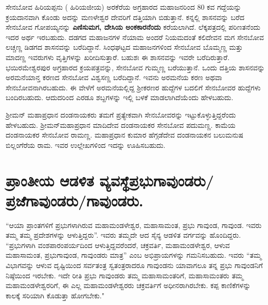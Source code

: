 ಸೇನಬೋವ ಹಿರಿಯಪ್ಪನು ( ಹಿರಿಯಜೀಯ) ಅರಕೆರೆಯ ಅಗ್ರಹಾರದ ಮಹಾಜನರಿಂದ 80 ಕವ ಗದ್ದೆಯನ್ನು ಕ್ರಯದಾನವಾಗಿ ಕೊಂಡು ಅದನ್ನು ಮಣಳೇಶ್ವರ ದೇವರಿಗೆ ದತ್ತಿಯಾಗಿ ಬಿಡುತ್ತಾನೆ. ಕನ್ನಲ್ಲಿ ಶಾಸನವನ್ನು ಬರೆದ ಸೇನಬೋವ ಗೋಪಯ್ಯನನ್ನು \textbf{ಎಣಿಸುಮಗ, ದೇಸಿಯ ಅಂಕಕಾರನೆಂದು} ಕರೆಯಲಾಗಿದೆ. ಲೆಕ್ಕಪತ್ರದಲ್ಲಿ ಪರಿಣತನೆಂದು ಇದರ ಅರ್ಥ ಇರಬಹುದು. ದಡಗದ ಮಹಾಜನಗಳ ನೆಯಾಮ ಅಂದರೆ ನಿಯಮದಂತೆ ಕಲಿದೇವನ ಮಗ ಸೇನಬೋವ ಲಚ್ಚಣ್ಣ ಡಿಡಗದ ಶಾಸನವನ್ನು ಬರೆದಿದ್ದಾನೆ. ಸಿಂಧಘಟ್ಟದ ಮಹಾಜನಗಳಿಂದ ಸೇನಬೋವ ಬೊಮ್ಮಣ್ಣ ಮತ್ತು ಮಾದಣ್ಣ ಇವರುಗಳು ವೃತ್ತಿಗಳನ್ನು ಖರೀದಿಸುತ್ತಾರೆ. ಬಹುಶಃ ಈ ಶಾಸನವನ್ನು ಇವರೇ ಬರೆದಿರುತ್ತಾರೆ. ಭಯಿರಮೇಶ್ವರಪುರ ಅಗ್ರಹಾರದ ಕ್ರಯಪತ್ರವನ್ನು, ಸೇನಬೋವ ಗುಮ್ಮಣ್ಣ ಬರೆಯುತ್ತಾನೆ. ಒಂದು ದತ್ತಿಯ ಶಾಸನವನ್ನು ಅರಮನೆಯಾನ್ತ ಕರಣದ ಸೇನಬೋವ ವಿಶ್ವಸಣ್ಣ ಬರೆದಿದ್ದಾನೆ. ಇವನು ಅರಮನೆಯ ಕರಣ ಅಥವಾ ಸೇನಬೋವನಾಗಿರಬಹುದು. ಈ ವೇಳೆಗೆ ಅರಮನೆಯಲ್ಲಿದ್ದ ಶ‍್ರೀಕರಣರ ಹುದ್ದೆಗಳ ಬದಲಿಗೆ ಸೇನಬೋವರ ಹುದ್ದೆಗಳು ಬಂದಿರಬಹುದು. ಆದುದರಿಂದ ಎರಡೂ ಶಬ್ದಗಳನ್ನು ಇಲ್ಲಿ ಬಳಕೆ ಮಾಡಲಾಗಿದೆಯೆಂದು ಹೇಳಬಹುದು.

ಶ‍್ರೀಮನ್​ ಮಹಾಪ್ರಧಾನ ದಂಡನಾಯಕರು ತಮಗೆ ಪ್ರತ್ಯೇಕವಾಗಿ ಸೇನಬೋವರನ್ನು ಇಟ್ಟುಕೊಳ್ಳುತ್ತಿದ್ದರೆಂದು ಹೇಳ\-ಬಹುದು. ಶ‍್ರೀಮನ್​ಮಹಾಪ್ರಧಾನ ಮಾದಿದೇವ ದಂಡನಾಯಕರ ಸೇನಬೋವ ಪದುಮಣ್ಣ. ಕಾಮೆಯ ದಂಡನಾಯಕರ ಸೇನಬೋವ ರಾಮಣ್ಣ. ಮಹಾಪ್ರಧಾನ ಕುಮಾರ ಹೆಗ್ಗಡೆದೇವ ದಂಡನಾಯಕನ ಬಲುಮನುಷ ಬಿಲ್ಲಂಗೆರೆಯ ರಾಮ. ಇವರ ಉಲ್ಲೇಖಗಳಿಂದ ಇದನ್ನು ಊಹಿಸಬಹುದು.


\section{ಪ್ರಾಂತೀಯ ಆಡಳಿತ ವ್ಯವಸ್ಥೆ\enginline{--}ಪ್ರಭುಗಾವುಂಡರು/ಪ್ರಜೆಗಾವುಂಡರು/ಗಾವುಂಡರು.}

“ಆಯಾ ಪ್ರಾಂತಗಳಿಗೆ ಪ್ರಭುಗಳಾಗಿರುವ ಮಹಾಮಂಡಳೇಶ್ವರ, ಮಹಾಸಾಮಂತ, ಪ್ರಭು ಗಾವುಂಡ, ಗಾವುಂಡ. ಇವರು ತಮ್ಮ ತಮ್ಮ ಪ್ರದೇಶಗಳನ್ನು ಆಳುತ್ತಿದ್ದರು”. ಇವರು ತಮ್ಮದೇ ಆದ ಸೈನ್ಯ ಆಡಳಿತ ವರ್ಗವನ್ನು ಹೊಂದಿದ್ದರು. “ಪ್ರಭುಗಳಾಗಿ ವಂಶಪಾರಂಪರ್ಯದಿಂದ ಆಳುತ್ತಿದ್ದವರೆಂದರೆ, ಚಕ್ರವರ್ತಿ, ಮಹಾಮಂಡಳೇಶ್ವರ, ಆಳುವ ಮಹಾಸಾಮಂತ, ಪ್ರಭುಗಾವುಂಡ, ಗಾವುಂಡರು ಮಾತ್ರ” ಎಂಬ ಅಭಿಪ್ರಾಯಗಳನ್ನು ಗಮನಿಸಬಹುದು. ಇವರು “ತಮ್ಮ ವಿಭಾಗವನ್ನು ಆಳುವ ದೃಷ್ಟಿಯಿಂದ ಸರ್ವತಂತ್ರ ಸ್ವತಂತ್ರರಾದರೂ ಗಾವುಂಡನು ಯಾವಾಗಲೂ ತನ್ನ ಪ್ರಭು ಗಾವುಂಡನಿಗೆ ನಿಷ್ಠೆಯಿಂದ ಇರಬೇಕು. ಇದೇ ರೀತಿ ಪ್ರಭು ಗಾವುಂಡರು ತಮ್ಮ ಮಹಾಸಾಮಂತರಿಗೆ, ಮಹಾಸಾಮಂತರು ತಮ್ಮ ಮಹಾಮಂಡಳೇಶ್ವರರಿಗೆ, ಈ ಎಲ್ಲ ಮಹಾಮಂಡಳೇಶ್ವರರು ಚಕ್ರವರ್ತಿಗೆ ಅಧೀನರಾಗಿರಬೇಕು. ಕಪ್ಪ ಕಾಣಿಕೆಗಳನ್ನು ಕಾಲಕ್ಕೆ ಸರಿಯಾಗಿ ಕೊಡುತ್ತಾ ಹೋಗಬೇಕು."

